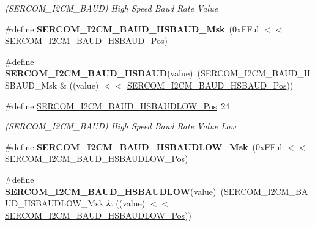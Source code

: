 \begin{DoxyCompactItemize}
\begin{DoxyCompactList}\small\item\em (S\+E\+R\+C\+O\+M\+\_\+\+I2\+C\+M\+\_\+\+B\+A\+U\+D) High Speed Baud Rate Value \end{DoxyCompactList}\item 
\hypertarget{group___s_a_m_l21___s_e_r_c_o_m_ga60bea349b716338cc603f8cf1c9ec648}{}\#define {\bfseries S\+E\+R\+C\+O\+M\+\_\+\+I2\+C\+M\+\_\+\+B\+A\+U\+D\+\_\+\+H\+S\+B\+A\+U\+D\+\_\+\+Msk}~(0x\+F\+Ful $<$$<$ S\+E\+R\+C\+O\+M\+\_\+\+I2\+C\+M\+\_\+\+B\+A\+U\+D\+\_\+\+H\+S\+B\+A\+U\+D\+\_\+\+Pos)\label{group___s_a_m_l21___s_e_r_c_o_m_ga60bea349b716338cc603f8cf1c9ec648}

\item 
\hypertarget{group___s_a_m_l21___s_e_r_c_o_m_gabcb4a49b47155b35e5c94ea440afed17}{}\#define {\bfseries S\+E\+R\+C\+O\+M\+\_\+\+I2\+C\+M\+\_\+\+B\+A\+U\+D\+\_\+\+H\+S\+B\+A\+U\+D}(value)~(S\+E\+R\+C\+O\+M\+\_\+\+I2\+C\+M\+\_\+\+B\+A\+U\+D\+\_\+\+H\+S\+B\+A\+U\+D\+\_\+\+Msk \& ((value) $<$$<$ \hyperlink{group___s_a_m_l21___s_e_r_c_o_m_gaaef72152e2e2560359aca1af29756158}{S\+E\+R\+C\+O\+M\+\_\+\+I2\+C\+M\+\_\+\+B\+A\+U\+D\+\_\+\+H\+S\+B\+A\+U\+D\+\_\+\+Pos}))\label{group___s_a_m_l21___s_e_r_c_o_m_gabcb4a49b47155b35e5c94ea440afed17}

\item 
\hypertarget{group___s_a_m_l21___s_e_r_c_o_m_ga38b50a5e6bbd65dd0d59c332689e3c05}{}\#define \hyperlink{group___s_a_m_l21___s_e_r_c_o_m_ga38b50a5e6bbd65dd0d59c332689e3c05}{S\+E\+R\+C\+O\+M\+\_\+\+I2\+C\+M\+\_\+\+B\+A\+U\+D\+\_\+\+H\+S\+B\+A\+U\+D\+L\+O\+W\+\_\+\+Pos}~24\label{group___s_a_m_l21___s_e_r_c_o_m_ga38b50a5e6bbd65dd0d59c332689e3c05}

\begin{DoxyCompactList}\small\item\em (S\+E\+R\+C\+O\+M\+\_\+\+I2\+C\+M\+\_\+\+B\+A\+U\+D) High Speed Baud Rate Value Low \end{DoxyCompactList}\item 
\hypertarget{group___s_a_m_l21___s_e_r_c_o_m_gad8e1a0dcc013a3c00d26d0cdf209541a}{}\#define {\bfseries S\+E\+R\+C\+O\+M\+\_\+\+I2\+C\+M\+\_\+\+B\+A\+U\+D\+\_\+\+H\+S\+B\+A\+U\+D\+L\+O\+W\+\_\+\+Msk}~(0x\+F\+Ful $<$$<$ S\+E\+R\+C\+O\+M\+\_\+\+I2\+C\+M\+\_\+\+B\+A\+U\+D\+\_\+\+H\+S\+B\+A\+U\+D\+L\+O\+W\+\_\+\+Pos)\label{group___s_a_m_l21___s_e_r_c_o_m_gad8e1a0dcc013a3c00d26d0cdf209541a}

\item 
\hypertarget{group___s_a_m_l21___s_e_r_c_o_m_ga7fc904506bff3d07440341018dd978fe}{}\#define {\bfseries S\+E\+R\+C\+O\+M\+\_\+\+I2\+C\+M\+\_\+\+B\+A\+U\+D\+\_\+\+H\+S\+B\+A\+U\+D\+L\+O\+W}(value)~(S\+E\+R\+C\+O\+M\+\_\+\+I2\+C\+M\+\_\+\+B\+A\+U\+D\+\_\+\+H\+S\+B\+A\+U\+D\+L\+O\+W\+\_\+\+Msk \& ((value) $<$$<$ \hyperlink{group___s_a_m_l21___s_e_r_c_o_m_ga38b50a5e6bbd65dd0d59c332689e3c05}{S\+E\+R\+C\+O\+M\+\_\+\+I2\+C\+M\+\_\+\+B\+A\+U\+D\+\_\+\+H\+S\+B\+A\+U\+D\+L\+O\+W\+\_\+\+Pos}))\label{group___s_a_m_l21___s_e_r_c_o_m_ga7fc904506bff3d07440341018dd978fe}


\end{DoxyCompactItemize}

